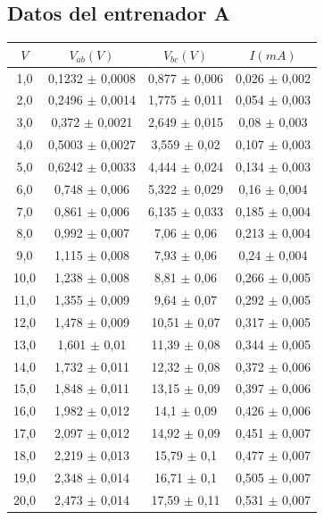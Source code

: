 \documentclass[a4paper,11pt]{article}
\begin{document}
\subsection*{Datos del entrenador A}
\begin{tabular}{|c|c|c|c|}
\hline
$V$	&    $V_{ab}(V)$	  &      $V_{bc}(V)$	    &    $I(mA)$ \\
\hline
1,0	   & 	0,1232 $\pm$ 0,0008    &   0,877 $\pm$  0,006	 &   0,026 $\pm$  0,002\\
\hline
2,0	   &		0,2496 $\pm$ 0,0014    &   1,775 $\pm$  0,011	 &   0,054 $\pm$  0,003\\
\hline
3,0	   & 	0,372 $\pm$  0,0021    &   2,649 $\pm$  0,015	 &   0,08  $\pm$  0,003\\
\hline
4,0	   & 	0,5003 $\pm$ 0,0027    &   3,559 $\pm$  0,02	 &   0,107 $\pm$  0,003\\
\hline
5,0	   & 	0,6242 $\pm$ 0,0033    &   4,444 $\pm$  0,024	 &   0,134 $\pm$  0,003\\
\hline
6,0	   & 	0,748 $\pm$  0,006     &   5,322 $\pm$  0,029	 &   0,16  $\pm$  0,004\\
\hline
7,0	   & 	0,861 $\pm$  0,006     &   6,135 $\pm$  0,033	 &   0,185 $\pm$  0,004\\
\hline
8,0	   & 	0,992 $\pm$  0,007     &   7,06 $\pm$   0,06	 &   0,213 $\pm$  0,004\\
\hline
9,0	   & 	1,115 $\pm$  0,008     &   7,93  $\pm$  0,06	 &   0,24  $\pm$  0,004\\
\hline
10,0   & 	1,238 $\pm$  0,008     &   8,81  $\pm$  0,06	 &   0,266 $\pm$  0,005\\
\hline
11,0   & 	1,355 $\pm$  0,009     &   9,64  $\pm$  0,07	 &   0,292 $\pm$  0,005\\
\hline
12,0   & 	1,478 $\pm$  0,009     &   10,51 $\pm$  0,07	 &   0,317 $\pm$  0,005\\
\hline
13,0   & 	1,601 $\pm$  0,01	   &   11,39 $\pm$  0,08	 &   0,344 $\pm$  0,005\\
\hline
14,0   & 	1,732 $\pm$  0,011     &   12,32 $\pm$  0,08	 &   0,372 $\pm$  0,006\\
\hline
15,0   & 	1,848 $\pm$  0,011     &   13,15 $\pm$  0,09	 &   0,397 $\pm$  0,006\\
\hline
16,0   & 	1,982 $\pm$  0,012     &   14,1  $\pm$  0,09	 &   0,426 $\pm$  0,006\\
\hline
17,0   & 	2,097 $\pm$  0,012     &   14,92 $\pm$  0,09	 &   0,451 $\pm$  0,007\\
\hline
18,0   & 	2,219 $\pm$  0,013     &   15,79 $\pm$  0,1	 &   0,477 $\pm$  0,007\\
\hline
19,0   & 	2,348 $\pm$  0,014     &   16,71 $\pm$  0,1	 &   0,505 $\pm$  0,007\\
\hline
20,0   & 	2,473 $\pm$  0,014     &   17,59 $\pm$  0,11	 &   0,531 $\pm$  0,007\\
\hline
\end{tabular}
\end{document}
